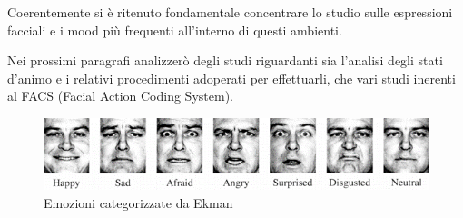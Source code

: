 \begin{preface}
    Coerentemente si è ritenuto fondamentale concentrare lo studio sulle espressioni facciali e i mood più frequenti all’interno di questi ambienti.
    
    Nei prossimi paragrafi analizzerò degli studi riguardanti sia l’analisi degli stati d’animo e i relativi procedimenti adoperati per effettuarli, che vari studi inerenti al FACS (Facial Action Coding System).
    
    \begin{figure}
        \includegraphics[width=1\linewidth]{images/1.png}
        \caption{Emozioni categorizzate da Ekman}
    \end{figure}
\end{preface}